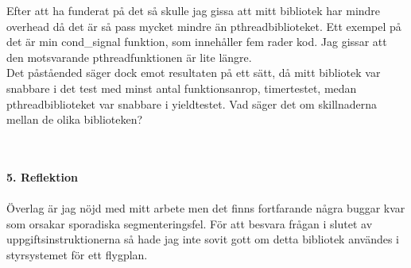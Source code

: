 \documentclass[a4paper,10pt]{article}
\begin{document}
Efter att ha funderat på det så skulle jag gissa att mitt bibliotek har mindre overhead då det är så pass mycket mindre än pthreadbiblioteket. Ett exempel på det är min cond\_signal funktion, som innehåller fem rader kod. Jag gissar att den motsvarande pthreadfunktionen är lite längre. \\
    Det påståended säger dock emot resultaten på ett sätt, då mitt bibliotek var snabbare i det test med minst antal funktionsanrop, timertestet, medan pthreadbiblioteket var snabbare i yieldtestet. Vad säger det om skillnaderna mellan de olika biblioteken?


    \maketitle
    \textbf
        {\\\\5. Reflektion\\\\}
        Överlag är jag nöjd med mitt arbete men det finns fortfarande några buggar kvar som orsakar sporadiska segmenteringsfel. För att besvara frågan i slutet av uppgiftsinstruktionerna så hade jag inte sovit gott om detta bibliotek användes i styrsystemet för ett flygplan.
\end{document}
